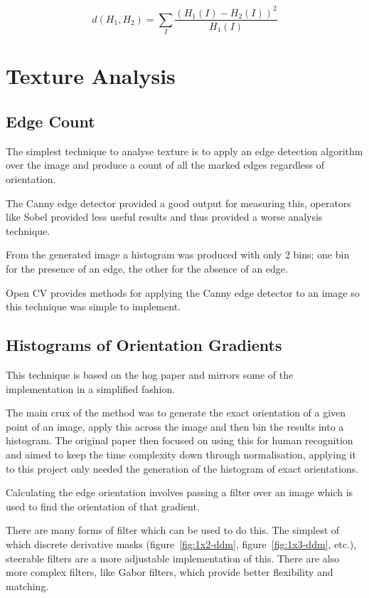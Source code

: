 \begin{equation}\label{eq:chi_squared}
d(H_1,H_2) =\sum_I{\frac{(H_1(I) - H_2(I))^2}{H_1(I)}}
\end{equation}


\section{Texture Analysis}

\subsection{Edge Count}
The simplest technique to analyse texture is to apply an edge detection algorithm over the image
and produce a count of all the marked edges regardless of orientation.

The Canny edge detector\cite{Canny1986Computational} provided a good output for measuring this, 
operators like Sobel provided less useful results and thus provided a worse analysis technique.

From the generated image a histogram was produced with only 2 bins; one bin for the presence of an
edge, the other for the absence of an edge.

Open CV provides methods for applying the Canny edge detector to an image so this technique was 
simple to implement.


\subsection{Histograms of Orientation Gradients}
This technique is based on the \gls{hog} paper\cite{Dalal2005Histograms} and mirrors some of the
implementation in a simplified fashion.

The main crux of the method was to generate the exact orientation of a given point of an image,
apply this across the image and then bin the results into a histogram. The original paper then
focused on using this for human recognition and aimed to keep the time complexity down through
normalisation, applying it to this project only needed the generation of the histogram of exact
orientations.

Calculating the edge orientation involves passing a filter over an image which is used to find the
orientation of that gradient. 

There are many forms of filter which can be used to do this. The simplest of which discrete 
derivative masks (figure~\ref{fig:1x2-ddm}, figure~\ref{fig:1x3-ddm}, etc.), steerable filters 
are a more adjustable implementation of this. There are also more complex filters, like Gabor 
filters, which provide better flexibility and matching.


